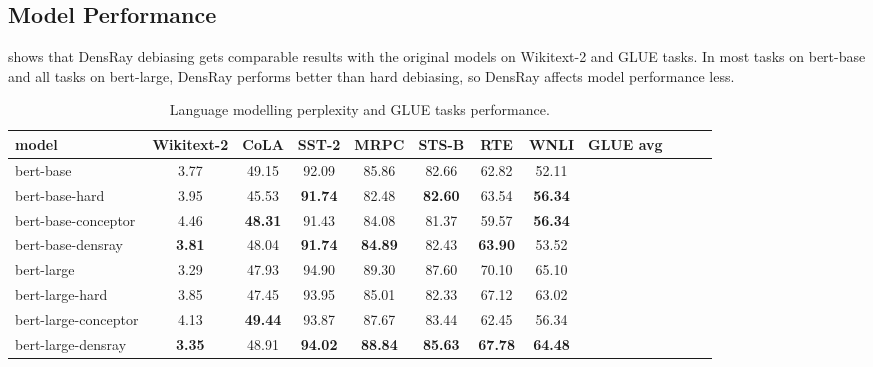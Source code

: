 \subsection{Model Performance}
 shows that DensRay debiasing gets comparable results with
the original models on Wikitext-2 and GLUE tasks. In most tasks on bert-base and all tasks on bert-large, DensRay performs better than hard debiasing, so DensRay affects model performance less.
\begin{table}[h]
\centering
\footnotesize
\begin{tabular}{l||c|cccccccccc}
\hline
model & Wikitext-2&CoLA &SST-2&MRPC&STS-B&RTE&WNLI&GLUE avg\\
\hline\hline
		bert-base &3.77&49.15&92.09&85.86&82.66&62.82&52.11\\
bert-base-hard &3.95&45.53&\textbf{91.74}&82.48&\textbf{82.60}&63.54&\textbf{56.34}\\
bert-base-conceptor &4.46&\textbf{48.31}&91.43&84.08&81.37&59.57&\textbf{56.34}\\
bert-base-densray &\textbf{3.81}&48.04&\textbf{91.74}&\textbf{84.89}&82.43&\textbf{63.90}&53.52\\
\hline
bert-large &3.29& 47.93&94.90&89.30&87.60&70.10&65.10\\
bert-large-hard &3.85& 47.45&93.95&85.01&82.33&67.12&63.02\\
bert-large-conceptor &4.13&\textbf{49.44}&93.87&87.67&83.44&62.45&56.34\\
bert-large-densray &\textbf{3.35}& 48.91&\textbf{94.02}&\textbf{88.84}&\textbf{85.63}&\textbf{67.78}&\textbf{64.48}\\
\hline
\end{tabular}
\caption{
Language modelling perplexity and GLUE tasks
performance. }
\end{table}


